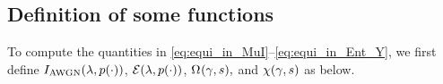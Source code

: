 \documentclass[12pt, draftclsnofoot,journal,onecolumn]{IEEEtran}
\begin{document}
\subsection{Definition of some functions}
\label{subsec:function_def}
To compute the quantities in \eqref{eq:equi_in_MuI}--\eqref{eq:equi_in_Ent_Y}, we first define $I_{\rm AWGN}(\lambda,p(\cdot))$, $\mathcal{E}(\lambda,p(\cdot))$, $\Enta[](\gainv,s),$ and $\chi(\gamma,s)$ as below.  

\end{document}
